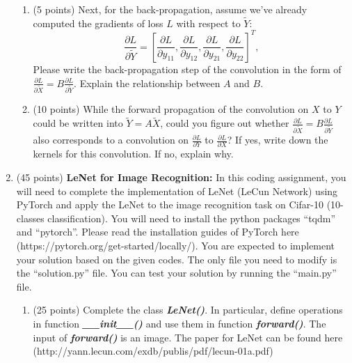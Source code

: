 \documentclass[11pt]{article}
\begin{document}
\begin{enumerate}
\begin{enumerate}
    \item (5 points) Next, for the back-propagation, assume we've
    already computed the gradients of loss $L$ with respect to
    $\tilde Y$:
    \begin{equation}
    \frac{\partial L}{\partial \tilde Y}=\left [\frac{\partial L}{\partial y_{11}}, \frac{\partial L}{\partial y_{12}}, \frac{\partial L}{\partial y_{21}}, \frac{\partial L}{\partial y_{22}} \right ]^T,
    \end{equation}
    Please write the back-propagation step of the convolution in
    the form of $\frac{\partial L}{\partial \tilde
    X}=B\frac{\partial L}{\partial \tilde Y}.$ Explain the
    relationship between $A$ and $B$.


    \item (10 points) While the forward propagation of the
    convolution on $X$ to $Y$ could be written into $\tilde
    Y=A\tilde X$, could you figure out whether $\frac{\partial
    L}{\partial \tilde X}=B\frac{\partial L}{\partial \tilde Y}$
    also corresponds to a convolution on $\frac{\partial
    L}{\partial Y}$ to $\frac{\partial L}{\partial X}$? If yes,
    write down the kernels for this convolution. If no, explain
    why.


    \end{enumerate}
    
    
    \item (45 points) \textbf{LeNet for Image Recognition:} In
    this coding assignment, you will need to complete the
    implementation of LeNet (LeCun Network) using PyTorch and
    apply the LeNet to the image recognition task on Cifar-10
    (10-classes classification). You will need to install the
    python packages ``tqdm'' and ``pytorch''. Please read the
    installation guides of PyTorch here
    (https://pytorch.org/get-started/locally/). You are expected
    to implement your solution based on the given codes. The only
    file you need to modify is the ``solution.py'' file. You can
    test your solution by running the ``main.py'' file.
    
    \begin{enumerate}
    \item (25 points) Complete the class \emph{\textbf{LeNet()}}.
    In particular, define operations in function
    \emph{\textbf{\_\_init\_\_()}} and use them in function
    \emph{\textbf{forward()}}. The input of
    \emph{\textbf{forward()}} is an image. The paper for LeNet
    can be found here
    (http://yann.lecun.com/exdb/publis/pdf/lecun-01a.pdf)
    

\end{enumerate}
\end{enumerate}
\end{document}

